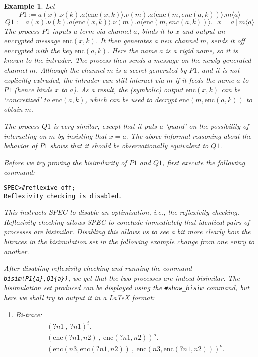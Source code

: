 \documentclass{article}
\newenvironment{example}{\begin{exa} \rm}{\end{exa}}
\newtheorem{exa}[theorem]{Example}
\begin{document}
\begin{example}
Let 
$$
P1   := a(x).\nu (k).a\langle \mathrm{enc}(x,k) \rangle. \nu (m).a\langle \mathrm{enc}(m,enc(a,k)) \rangle.m\langle a \rangle
$$
$$
Q1   := a(x).\nu (k).a\langle \mathrm{enc}(x,k) \rangle. \nu (m).a\langle \mathrm{enc}(m,enc(a,k)) \rangle.[x = a] m \langle a \rangle
$$
The process $P1$ inputs a term via channel $a$, binds it to $x$ and output
an encrypted message $\mathrm{enc}(x,k)$. It then generates a new channel $m$,
sends it off encrypted with the key $\mathrm{enc}(a,k)$. Here the name $a$ is a rigid name,
so it is known to the intruder. The process then sends a message on the newly generated
channel $m$. Although the channel $m$ is a secret generated by $P1$, and it is not
explicitly extruded, the intruder can still interact via $m$ if it feeds the name $a$
to $P1$ (hence binds $x$ to $a$). As a result, the (symbolic) output $\mathrm{enc}(x,k)$
can be `concretized' to $\mathrm{enc}(a,k)$, which can be used to decrypt 
$\mathrm{enc}(m, \mathrm{enc}(a,k))$ to obtain $m.$

The process $Q1$ is very similar, except that it puts a `guard' on the possibility of interacting
on $m$ by insisting that $x = a.$ The above informal reasoning about the behavior of $P1$
shows that it should be observationally equivalent to $Q1$. 

Before we try proving the bisimilarity of $P1$ and $Q1$, first execute the following command:
\begin{verbatim}
SPEC>#reflexive off; 
Reflexivity checking is disabled.
\end{verbatim}
This instructs SPEC to disable an optimisation, i.e., the reflexivity checking.
Reflexivity checking allows SPEC to conclude immediately that identical pairs of processes
are bisimilar. Disabling this allows us to see a bit more clearly how the bitraces
in the bisimulation set in the following example change from one entry to another. 

After disabling reflexivity checking 
and running the command \texttt{bisim(P1\{a\},Q1\{a\})}, we get that the two processes are indeed bisimilar.
The bisimulation set produced can be displayed using the \texttt{\#show\_bisim} command, but here
we shall try to output it in a LaTeX format:
\begin{enumerate} 
\item 
Bi-trace: 
$$
\begin{array}{l}
(?n1~ , ~ ?n1)^i. \\ 
(\mbox{enc}(?n1,n2)~ , ~ \mbox{enc}(?n1,n2))^o. \\ 
(\mbox{enc}(n3,\mbox{enc}(?n1,n2))~ , ~ \mbox{enc}(n3,\mbox{enc}(?n1,n2)))^o. \\ 
\end{array}
$$


\end{enumerate}
\end{example}
\end{document}
